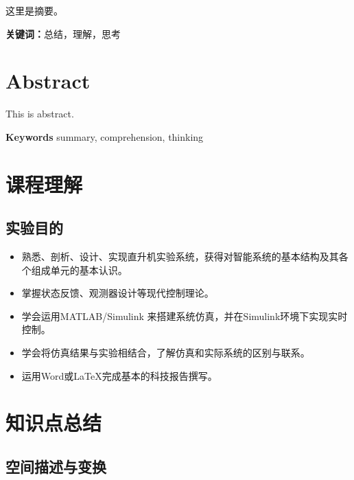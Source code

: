 \documentclass[a4paper,12pt]{report}
\begin{document}
这里是摘要。

\textbf{关键词：}总结，理解，思考

\chapter*{Abstract}

This is abstract.

\textbf{Keywords } summary, comprehension, thinking

\tableofcontents %

\chapter{课程理解}
\setcounter{page}{1}

\section{实验目的}

\begin{itemize}
    \item 熟悉、剖析、设计、实现直升机实验系统，获得对智能系统的基本结构及其各个组成单元的基本认识。
    \item 掌握状态反馈、观测器设计等现代控制理论。
    \item 学会运用MATLAB/Simulink 来搭建系统仿真，并在Simulink环境下实现实时控制。
    \item 学会将仿真结果与实验相结合，了解仿真和实际系统的区别与联系。
    \item 运用Word或\LaTeX 完成基本的科技报告撰写。
\end{itemize}

\chapter{知识点总结} 

\section{空间描述与变换}
\end{document}
